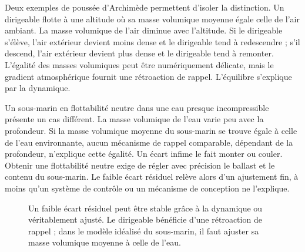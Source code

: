 Deux exemples de poussée d’Archimède permettent d’isoler la distinction. Un dirigeable flotte à une altitude où sa masse volumique moyenne égale celle de l’air ambiant. La masse volumique de l’air diminue avec l’altitude. Si le dirigeable s’élève, l’air extérieur devient moins dense et le dirigeable tend à redescendre ; s’il descend, l’air extérieur devient plus dense et le dirigeable tend à remonter. L’égalité des masses volumiques peut être numériquement délicate, mais le gradient atmosphérique fournit une rétroaction de rappel. L’équilibre s’explique par la dynamique.

Un sous-marin en flottabilité neutre dans une eau presque incompressible présente un cas différent. La masse volumique de l’eau varie peu avec la profondeur. Si la masse volumique moyenne du sous-marin se trouve égale à celle de l’eau environnante, aucun mécanisme de rappel comparable, dépendant de la profondeur, n’explique cette égalité. Un écart infime le fait monter ou couler. Obtenir une flottabilité neutre exige de régler avec précision le ballast et le contenu du sous-marin. Le faible écart résiduel relève alors d’un ajustement fin, à moins qu’un système de contrôle ou un mécanisme de conception ne l’explique.

\begin{figure}[ht]
\centering
{}
\caption{Un faible écart résiduel peut être stable grâce à la dynamique ou véritablement ajusté. Le dirigeable bénéficie d’une rétroaction de rappel ; dans le modèle idéalisé du sous-marin, il faut ajuster sa masse volumique moyenne à celle de l’eau.}
\label{fig:blimp-submarine}
\end{figure}

